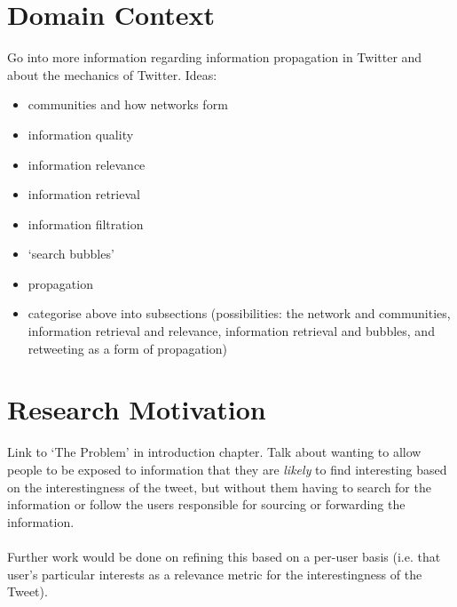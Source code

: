 \section{Domain Context}
Go into more information regarding information propagation in Twitter and about the mechanics of Twitter. Ideas:
\begin{itemize}
\item communities and how networks form
\item information quality
\item information relevance
\item information retrieval
\item information filtration
\item `search bubbles'
\item propagation
\item categorise above into subsections (possibilities: the network and communities, information retrieval and relevance, information retrieval and bubbles, and retweeting as a form of propagation)
\end{itemize}

\section{Research Motivation}
Link to `The Problem' in introduction chapter. Talk about wanting to allow people to be exposed to information that they are \textit{likely} to find interesting based on the interestingness of the tweet, but without them having to search for the information or follow the users responsible for sourcing or forwarding the information. \\ \\
Further work would be done on refining this based on a per-user basis (i.e. that user's particular interests as a relevance metric for the interestingness of the Tweet).